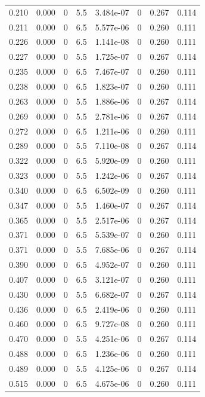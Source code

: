 \documentclass[preview]{standalone}
\begin{document}
{{\begin{tabular}{L{1.2cm}C{1.2cm} C{0.3cm}C{0.5cm} C{1.4cm}C{1.4cm} C{1.4cm}C{1.4cm}}
  0.210  &  0.000  & 0     & 5.5 &  3.484e-07  & 0  & 0.267 &  0.114   \\ 
  0.211  &  0.000  & 0     & 6.5 &  5.577e-06  & 0  & 0.260 &  0.111   \\ 
  0.226  &  0.000  & 0     & 6.5 &  1.141e-08  & 0  & 0.260 &  0.111   \\ 
  0.227  &  0.000  & 0     & 5.5 &  1.725e-07  & 0  & 0.267 &  0.114   \\ 
  0.235  &  0.000  & 0     & 6.5 &  7.467e-07  & 0  & 0.260 &  0.111   \\ 
  0.238  &  0.000  & 0     & 6.5 &  1.823e-07  & 0  & 0.260 &  0.111   \\ 
  0.263  &  0.000  & 0     & 5.5 &  1.886e-06  & 0  & 0.267 &  0.114   \\ 
  0.269  &  0.000  & 0     & 5.5 &  2.781e-06  & 0  & 0.267 &  0.114   \\ 
  0.272  &  0.000  & 0     & 6.5 &  1.211e-06  & 0  & 0.260 &  0.111   \\ 
  0.289  &  0.000  & 0     & 5.5 &  7.110e-08  & 0  & 0.267 &  0.114   \\ 
  0.322  &  0.000  & 0     & 6.5 &  5.920e-09  & 0  & 0.260 &  0.111   \\ 
  0.323  &  0.000  & 0     & 5.5 &  1.242e-06  & 0  & 0.267 &  0.114   \\ 
  0.340  &  0.000  & 0     & 6.5 &  6.502e-09  & 0  & 0.260 &  0.111   \\ 
  0.347  &  0.000  & 0     & 5.5 &  1.460e-07  & 0  & 0.267 &  0.114   \\ 
  0.365  &  0.000  & 0     & 5.5 &  2.517e-06  & 0  & 0.267 &  0.114   \\ 
  0.371  &  0.000  & 0     & 6.5 &  5.539e-07  & 0  & 0.260 &  0.111   \\ 
  0.371  &  0.000  & 0     & 5.5 &  7.685e-06  & 0  & 0.267 &  0.114   \\ 
  0.390  &  0.000  & 0     & 6.5 &  4.952e-07  & 0  & 0.260 &  0.111   \\ 
  0.407  &  0.000  & 0     & 6.5 &  3.121e-07  & 0  & 0.260 &  0.111   \\ 
  0.430  &  0.000  & 0     & 5.5 &  6.682e-07  & 0  & 0.267 &  0.114   \\ 
  0.436  &  0.000  & 0     & 6.5 &  2.419e-06  & 0  & 0.260 &  0.111   \\ 
  0.460  &  0.000  & 0     & 6.5 &  9.727e-08  & 0  & 0.260 &  0.111   \\ 
  0.470  &  0.000  & 0     & 5.5 &  4.251e-06  & 0  & 0.267 &  0.114   \\ 
  0.488  &  0.000  & 0     & 6.5 &  1.236e-06  & 0  & 0.260 &  0.111   \\ 
  0.489  &  0.000  & 0     & 5.5 &  4.125e-06  & 0  & 0.267 &  0.114   \\ 
  0.515  &  0.000  & 0     & 6.5 &  4.675e-06  & 0  & 0.260 &  0.111   \\ 
\hline 
\end{tabular} 

}}
\end{document}
